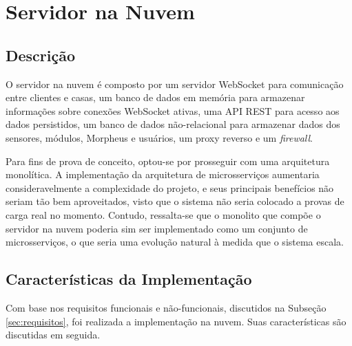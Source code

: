 \section{Servidor na Nuvem \label{servidorNaNuvem}}

\subsection{Descrição}

O servidor na nuvem é composto por um servidor WebSocket para comunicação entre clientes e casas, um banco de dados em memória para armazenar informações sobre conexões WebSocket ativas, uma API REST para acesso aos dados persistidos, um banco de dados não-relacional para armazenar dados dos sensores, módulos, Morpheus e usuários, um proxy reverso e um \emph{firewall}.

Para fins de prova de conceito, optou-se por prosseguir com uma arquitetura monolítica. A implementação da arquitetura de microsserviços aumentaria consideravelmente a complexidade do projeto, e seus principais benefícios não seriam tão bem aproveitados, visto que o sistema não seria colocado a provas de carga real no momento. Contudo, ressalta-se que o monolito que compõe o servidor na nuvem poderia sim ser implementado como um conjunto de microsserviços, o que seria uma evolução natural à medida que o sistema escala.

\subsection{Características da Implementação}

Com base nos requisitos funcionais e não-funcionais, discutidos na Subseção \ref{sec:requisitos}, foi realizada a implementação na nuvem. Suas características são discutidas em seguida.

